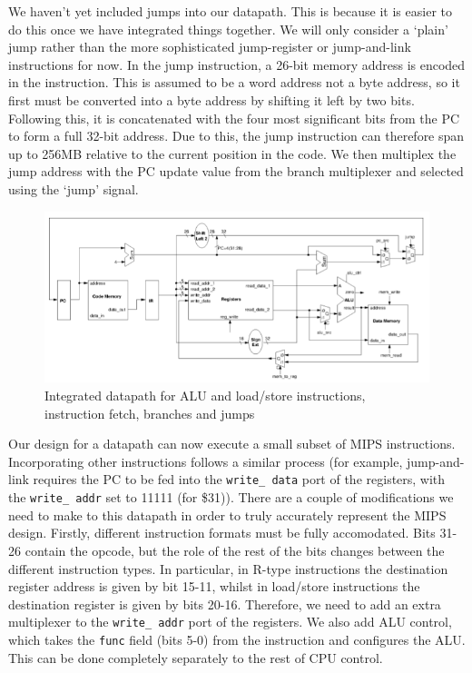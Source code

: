 \documentclass{article}
\begin{document}
	We haven't yet included jumps into our datapath. This is because it is easier to do this once we have integrated things together. We will only consider a `plain' jump rather than the more sophisticated jump-register or jump-and-link instructions for now. In the jump instruction, a 26-bit memory address is encoded in the instruction. This is assumed to be a word address not a byte address, so it first must be converted into a byte address by shifting it left by two bits. Following this, it is concatenated with the four most significant bits from the PC to form a full 32-bit address. Due to this, the jump instruction can therefore span up to 256MB relative to the current position in the code. We then multiplex the jump address with the PC update value from the branch multiplexer and selected using the `jump' signal.
	
	\begin{figure}[ht]
		\centering
		\includegraphics[width=\textwidth]{fully_integrated_datapath}
		\caption{Integrated datapath for ALU and load/store instructions, instruction fetch, branches and jumps}
		\label{fig:fully_integrated_datapath}
	\end{figure}
	
\par 
	Our design for a datapath can now execute a small subset of MIPS instructions. Incorporating other instructions follows a similar process (for example, jump-and-link requires the PC to be fed into the \texttt{write\_ data} port of the registers, with the \texttt{write\_ addr} set to 11111 (for \$31)). There are a couple of modifications we need to make to this datapath in order to truly accurately represent the MIPS design. Firstly, different instruction formats must be fully accomodated. Bits 31-26 contain the opcode, but the role of the rest of the bits changes between the different instruction types. In particular, in R-type instructions the destination register address is given by bit 15-11, whilst in load/store instructions the destination register is given by bits 20-16. Therefore, we need to add an extra multiplexer to the \texttt{write\_ addr} port of the registers. We also add ALU control, which takes the \texttt{func} field (bits 5-0) from the instruction and configures the ALU. This can be done completely separately to the rest of CPU control.
	
\end{document}
